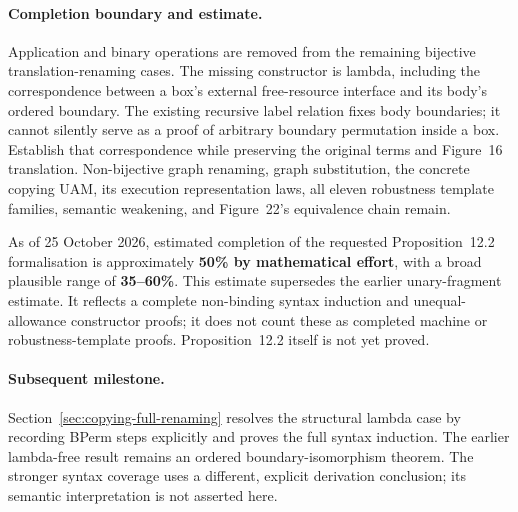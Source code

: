 
\paragraph{Completion boundary and estimate.}
Application and binary operations are removed from the remaining bijective
translation-renaming cases. The missing constructor is lambda, including the
correspondence between a box's external free-resource interface and its body's
ordered boundary. The existing recursive label relation fixes body boundaries;
it cannot silently serve as a proof of arbitrary boundary permutation inside a
box. Establish that correspondence while preserving the original terms and
Figure~16 translation. Non-bijective graph renaming, graph substitution, the
concrete copying UAM, its execution representation laws, all eleven robustness
template families, semantic weakening, and Figure~22's equivalence chain remain.

As of 25 October 2026, estimated completion of the requested Proposition~12.2
formalisation is approximately \textbf{50\% by mathematical effort}, with a broad
plausible range of \textbf{35--60\%}. This estimate supersedes the earlier
unary-fragment estimate. It reflects a complete non-binding syntax induction and
unequal-allowance constructor proofs; it does not count these as completed machine
or robustness-template proofs. Proposition~12.2 itself is not yet proved.


\paragraph{Subsequent milestone.}
Section~\ref{sec:copying-full-renaming} resolves the structural lambda case by
recording BPerm steps explicitly and proves the full syntax induction. The earlier
lambda-free result remains an ordered boundary-isomorphism theorem. The stronger
syntax coverage uses a different, explicit derivation conclusion; its semantic
interpretation is not asserted here.
